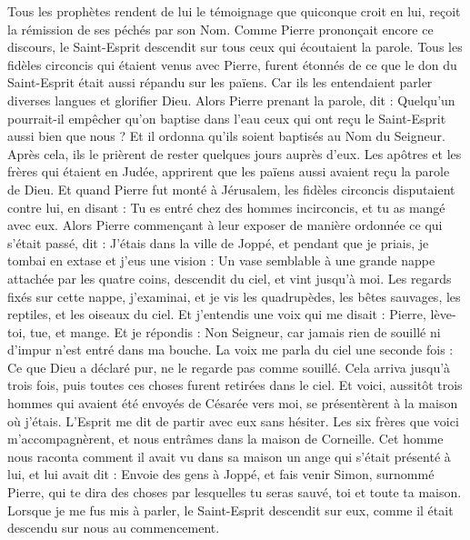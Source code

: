 \begin{multicols}{2}
Tous les prophètes rendent de lui le témoignage que quiconque croit en lui, reçoit la rémission de ses péchés par son Nom.
Comme Pierre prononçait encore ce discours, le Saint-Esprit descendit sur tous ceux qui écoutaient la parole.
Tous les fidèles circoncis qui étaient venus avec Pierre, furent étonnés de ce que le don du Saint-Esprit était aussi répandu sur les païens.
Car ils les entendaient parler diverses langues et glorifier Dieu.
Alors Pierre prenant la parole, dit : Quelqu’un pourrait-il empêcher qu’on baptise dans l’eau ceux qui ont reçu le Saint-Esprit aussi bien que nous ?
Et il ordonna qu'ils soient baptisés au Nom du Seigneur. Après cela, ils le prièrent de rester quelques jours auprès d’eux.
\VerseOne{}Les apôtres et les frères qui étaient en Judée, apprirent que les païens aussi avaient reçu la parole de Dieu.
Et quand Pierre fut monté à Jérusalem, les fidèles circoncis disputaient contre lui,
en disant : Tu es entré chez des hommes incirconcis, et tu as mangé avec eux.
Alors Pierre commençant à leur exposer de manière ordonnée ce qui s’était passé, dit :
J’étais dans la ville de Joppé, et pendant que je priais, je tombai en extase et j’eus une vision : Un vase semblable à une grande nappe attachée par les quatre coins, descendit du ciel, et vint jusqu'à moi.
Les regards fixés sur cette nappe, j’examinai, et je vis les quadrupèdes, les bêtes sauvages, les reptiles, et les oiseaux du ciel.
Et j’entendis une voix qui me disait : Pierre, lève-toi, tue, et mange.
Et je répondis : Non Seigneur, car jamais rien de souillé ni d’impur n’est entré dans ma bouche.
La voix me parla du ciel une seconde fois : Ce que Dieu a déclaré pur, ne le regarde pas comme souillé.
Cela arriva jusqu'à trois fois, puis toutes ces choses furent retirées dans le ciel.
Et voici, aussitôt trois hommes qui avaient été envoyés de Césarée vers moi, se présentèrent à la maison où j'étais.
L’Esprit me dit de partir avec eux sans hésiter. Les six frères que voici m’accompagnèrent, et nous entrâmes dans la maison de Corneille.
Cet homme nous raconta comment il avait vu dans sa maison un ange qui s'était présenté à lui, et lui avait dit : Envoie des gens à Joppé, et fais venir Simon, surnommé Pierre,
qui te dira des choses par lesquelles tu seras sauvé, toi et toute ta maison.
Lorsque je me fus mis à parler, le Saint-Esprit descendit sur eux, comme il était descendu sur nous au commencement.

\end{multicols}
